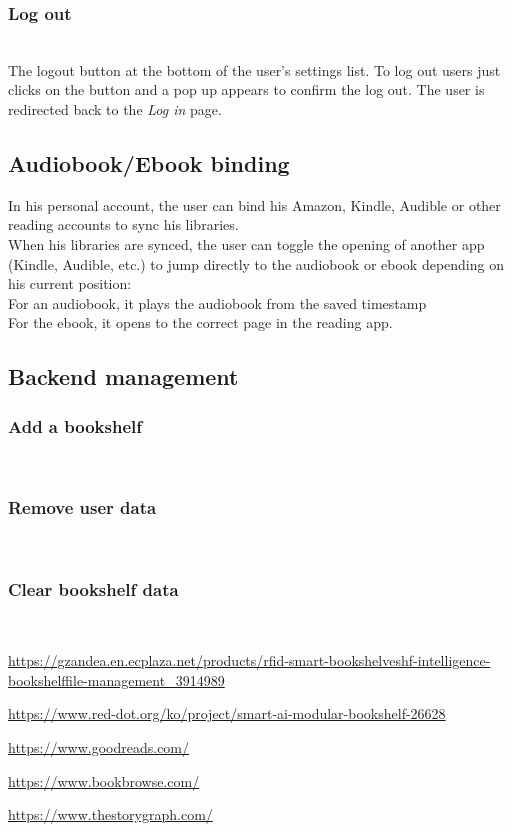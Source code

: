 \documentclass[conference]{IEEEtran}
\begin{document}
\subsubsection{Log out}\hfill\\
The logout button at the bottom of the user's settings list. To log out users just clicks on the button and a pop up appears to confirm the log out. The user is redirected back to the \textit{Log in} page.\\


\subsection{Audiobook/Ebook binding}
In his personal account, the user can bind his Amazon, Kindle, Audible or other reading accounts to sync his libraries.\\
When his libraries are synced, the user can toggle the opening of another app (Kindle, Audible, etc.) to jump directly to the audiobook or ebook depending on his current position:\\
For an audiobook, it plays the audiobook from the saved timestamp\\
For the ebook, it opens to the correct page in the reading app.\\


\subsection{Backend management}

\subsubsection{Add a bookshelf}\hfill\\

\subsubsection{Remove user data}\hfill\\

\subsubsection{Clear bookshelf data}\hfill\\


\begin{thebibliography}{00}
\url{https://gzandea.en.ecplaza.net/products/rfid-smart-bookshelveshf-intelligence-bookshelffile-management_3914989}

\url{https://www.red-dot.org/ko/project/smart-ai-modular-bookshelf-26628}

\url{https://www.goodreads.com/}

\url{https://www.bookbrowse.com/}

\url{https://www.thestorygraph.com/}

\end{thebibliography}
\end{document}
